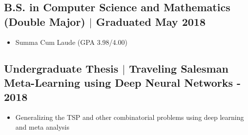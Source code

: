 \documentclass[10pt]{article}
\begin{document}
\subsection{B.S. in Computer Science and Mathematics (Double Major) $\vert$ Graduated May 2018}
\begin{itemize}
    \item Summa Cum Laude (GPA 3.98/4.00)
\end{itemize}

\subsection{Undergraduate Thesis $\vert$ Traveling Salesman Meta-Learning using Deep Neural Networks - 2018}
\begin{itemize}
    \item Generalizing the TSP and other combinatorial problems using deep learning and meta analysis
\end{itemize}
\end{document}
